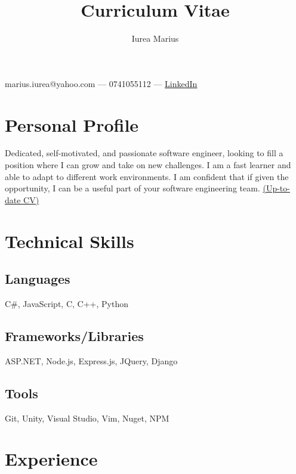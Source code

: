 \documentclass[a4paper,hidelinks,11pt]{article}
\begin{document}
\title{Curriculum Vitae}
\author{Iurea Marius}
\renewcommand{\maketitle} 
{
        \begin{center}
        {\huge\bfseries
        \thetitle

        \theauthor}

        marius.iurea@yahoo.com --- 0741055112 --- \href{https://www.linkedin.com/in/marius-iurea-49b7021b5/}{LinkedIn}

        \end{center}
}

\maketitle

\section{Personal Profile}
Dedicated, self-motivated, and passionate software engineer, looking to fill a position where I can grow and take on new
challenges. I am a fast learner and able to adapt to different work environments. I am confident that if given the opportunity, I can be a useful part of your software engineering team. \href{https://github.com/IureaMarius/CV}{(Up-to-date CV)}



\section{Technical Skills}
\subsection{Languages}
C\#, JavaScript, C, C++, Python
\subsection{Frameworks/Libraries}
ASP.NET, Node.js, Express.js, JQuery, Django
\subsection{Tools}
Git, Unity, Visual Studio, Vim, Nuget, NPM

\section{Experience}
\end{document}
